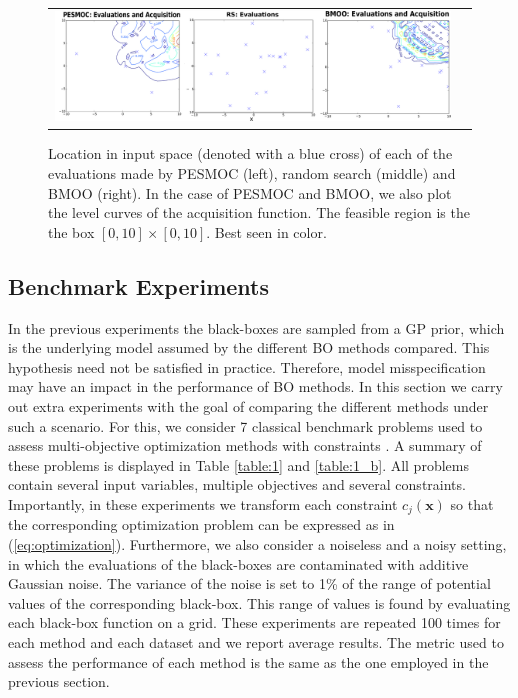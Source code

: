 \documentclass[review,preprint,12pt]{elsarticle}
\begin{document}
\begin{figure}[htb]
	\begin{tabular}{cc}
	\includegraphics[width=0.9\linewidth]{figure.pdf}
	\end{tabular}
	\caption{{\small Location in input space (denoted with a blue cross) of each of the evaluations made by PESMOC 
		(left), random search (middle) and BMOO (right). In the case of PESMOC and BMOO, we also plot the level 
		curves of the acquisition function. The feasible region is the the box $[0,10] \times [0,10]$. Best seen in color. }}
	\label{fig:evaluations}
\end{figure}

\subsection{Benchmark Experiments}

In the previous experiments the black-boxes are sampled from a GP prior, which is the underlying model assumed by the different
BO methods compared. This hypothesis need not be satisfied in practice. Therefore, model misspecification may have an impact in 
the performance of BO methods. In this section we carry out extra experiments with the goal of comparing the different methods 
under such a scenario. For this, we consider 7 classical benchmark problems used to assess multi-objective optimization methods 
with constraints \citep{chafekar2003constrained,deb2002fast}. A summary of these problems is displayed in Table \ref{table:1} and \ref{table:1_b}. 
All problems contain several input variables, multiple objectives and several constraints. Importantly, in these experiments 
we transform each constraint $c_j(\mathbf{x})$ so that the corresponding optimization problem can be expressed as 
in (\ref{eq:optimization}). Furthermore, we also consider a noiseless and a noisy setting, in which the evaluations of the
black-boxes are contaminated with additive Gaussian noise. The variance of the noise is set to 1\% of the range of potential 
values of the corresponding black-box. This range of values is found by evaluating each black-box function on a grid.
These experiments are repeated 100 times for each method and each dataset and we report average results. The metric used
to assess the performance of each method is the same as the one employed in the previous section.
\end{document}
